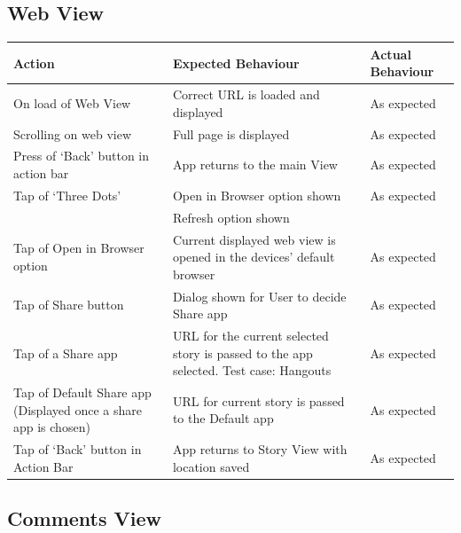 \documentclass[11pt]{article}
\begin{document}
\subsection*{Web View}

\begin{center}
\begin{tabular}{ | p{5cm} | p{5cm} | p{5cm} |}
	\hline
	\textbf{Action} & \textbf{Expected Behaviour} & \textbf{Actual Behaviour} \\
    \hline
	On load of Web View & Correct URL is loaded and displayed & As expected \\
	\hline
	Scrolling on web view & Full page is displayed & As expected \\
	\hline
	Press of ‘Back’ button in action bar & App returns to the main View & As expected \\
	\hline
	Tap of ‘Three Dots’ & Open in Browser option shown & As expected \\ & Refresh option shown & \\
	\hline
	Tap of Open in Browser option & Current displayed web view is opened in the devices’ default browser & As expected \\
	\hline
	Tap of Share button & Dialog shown for User to decide Share app & As expected \\
	\hline
Tap of a Share app & URL for the current selected story is passed to the app selected. Test case: Hangouts & As expected \\
	\hline
Tap of Default Share app (Displayed once a share app is chosen) & URL for current story is passed to the Default app & As expected \\
	\hline
Tap of ‘Back’ button in Action Bar & App returns to Story View with location saved & As expected \\
	\hline

\end{tabular}
\end{center}

\subsection*{Comments View}
\end{document}
